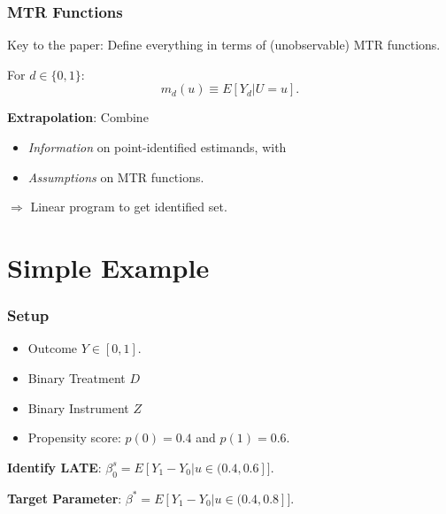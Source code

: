 \documentclass[11pt, aspectratio=169]{beamer}
\begin{document}
\begin{frame}
    \frametitle{MTR Functions}

    Key to the paper: Define everything in terms of (unobservable) MTR functions.

    For $d\in\{0,1\}$:
    \begin{equation}
        m_d(u) \equiv E[Y_d | U=u].
    \end{equation}

    \vspace{0.5cm}

    \textbf{Extrapolation}: Combine
    \begin{itemize}
        \item \textit{Information} on point-identified estimands, with
        \item \textit{Assumptions} on MTR functions.
    \end{itemize}

    \vspace{0.5cm}

    $\Rightarrow$ Linear program to get identified set.

\end{frame}

\section{Simple Example}

\begin{frame}
    \frametitle{Setup}

    \begin{itemize}
        \item Outcome $Y \in [0,1]$.
        \item Binary Treatment $D$
        \item Binary Instrument $Z$
        \item Propensity score: $p(0) = 0.4$ and $p(1) = 0.6$.
    \end{itemize}

    \vspace{0.5cm}

    \textbf{Identify LATE}: $\beta_0^s = E[Y_1 - Y_0 | u \in (0.4, 0.6]]$.

    \vspace{0.5cm}

    \textbf{Target Parameter}: $\beta^* = E[Y_1 - Y_0 | u \in (0.4, 0.8]]$.

\end{frame}
\end{document}
